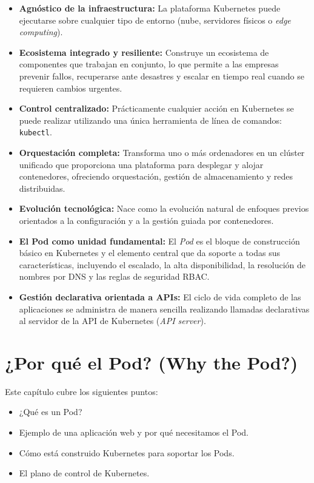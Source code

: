 \begin{itemize}
    \item \textbf{Agnóstico de la infraestructura:} La plataforma Kubernetes puede ejecutarse sobre cualquier tipo de entorno (nube, servidores físicos o \textit{edge computing}).
    \item \textbf{Ecosistema integrado y resiliente:} Construye un ecosistema de componentes que trabajan en conjunto, lo que permite a las empresas prevenir fallos, recuperarse ante desastres y escalar en tiempo real cuando se requieren cambios urgentes.
    \item \textbf{Control centralizado:} Prácticamente cualquier acción en Kubernetes se puede realizar utilizando una única herramienta de línea de comandos: \texttt{kubectl}.
    \item \textbf{Orquestación completa:} Transforma uno o más ordenadores en un clúster unificado que proporciona una plataforma para desplegar y alojar contenedores, ofreciendo orquestación, gestión de almacenamiento y redes distribuidas.
    \item \textbf{Evolución tecnológica:} Nace como la evolución natural de enfoques previos orientados a la configuración y a la gestión guiada por contenedores.
    \item \textbf{El Pod como unidad fundamental:} El \textit{Pod} es el bloque de construcción básico en Kubernetes y el elemento central que da soporte a todas sus características, incluyendo el escalado, la alta disponibilidad, la resolución de nombres por DNS y las reglas de seguridad RBAC.
    \item \textbf{Gestión declarativa orientada a APIs:} El ciclo de vida completo de las aplicaciones se administra de manera sencilla realizando llamadas declarativas al servidor de la API de Kubernetes (\textit{API server}).
\end{itemize}

\section{¿Por qué el Pod? (Why the Pod?)}

Este capítulo cubre los siguientes puntos:
\begin{itemize}
    \item ¿Qué es un Pod?
    \item Ejemplo de una aplicación web y por qué necesitamos el Pod.
    \item Cómo está construido Kubernetes para soportar los Pods.
    \item El plano de control de Kubernetes.
\end{itemize}

